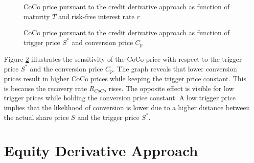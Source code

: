 \begin{figure}
\centering
{}
    \caption[CoCo price pursuant to the credit derivative approach as function of maturity and interest rate]{CoCo price pursuant to the credit derivative approach as function of maturity $T$ and risk-free interest rate $r$}
  \label{fig:cd2}
  \end{figure}
\begin{figure}
\centering
    \caption[CoCo price pursuant to the credit derivative approach as function of trigger price and conversion price]{CoCo price pursuant to the credit derivative approach as function of trigger price $S^*$ and conversion price $C_p$}
  \label{fig:cd3}
  \end{figure}

Figure \ref{fig:cd3} illustrates the sensitivity of the CoCo price with respect to the trigger price $S^*$ and the conversion price $C_p$. The graph reveals that lower conversion prices result in higher CoCo prices while keeping the trigger price constant. This is because the recovery rate $R_{CoCo}$ rises. The opposite effect is visible for low trigger prices while holding the conversion price constant. A low trigger price implies that the likelihood of conversion is lower due to a higher distance between the actual share price $S$ and the trigger price $S^*$.

\section{Equity Derivative Approach}\label{sensiequity}

